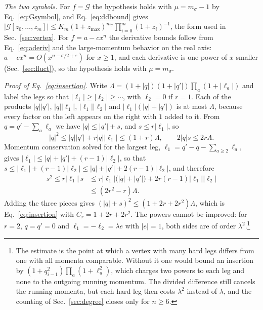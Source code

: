 \documentclass[a4paper,11pt]{article}
\begin{document}
\textit{The two symbols.} For $f=\mathcal G$ the hypothesis holds with $\mu=m_\sigma-1$ by Eq.~\eqref{eq:Gsymbol}, and Eq.~\eqref{eq:ddbound} gives $|\mathcal G[z_0,\dots,z_m]|\le K_m(1+z_{\max})^{m_\sigma}\prod_{i=0}^m(1+z_i)^{-1}$, the form used in Sec.~\ref{sec:vertex}. For $f=a-cx^n$ the derivative bounds follow from Eq.~\eqref{eq:aderiv} and the large-momentum behavior on the real axis: $a-cx^n=O(x^{n-\sigma/2+\varepsilon})$ for $x\ge1$, and each derivative is one power of $x$ smaller (Sec.~\ref{sec:fluct}), so the hypothesis holds with $\mu=m_\sigma$.

\textit{Proof of Eq.~\eqref{eq:insertion}.} Write $\Lambda=(1+|q|)(1+|q'|)\prod_a(1+|\ell_a|)$ and label the legs so that $|\ell_1|\ge|\ell_2|\ge\cdots$, with $\ell_2=0$ if $r=1$. Each of the products $|q||q'|$, $|q||\ell_1|$, $|\ell_1||\ell_2|$ and $|\ell_1|(|q|+|q'|)$ is at most $\Lambda$, because every factor on the left appears on the right with $1$ added to it. From $q=q'-\sum_a\ell_a$ we have $|q|\le|q'|+s$, and $s\le r|\ell_1|$, so
\[
|q|^2\le|q||q'|+r|q||\ell_1|\le(1+r)\Lambda,\qquad 2|q|s\le2r\Lambda .
\]
Momentum conservation solved for the largest leg, $\ell_1=q'-q-\sum_{a\ge2}\ell_a$, gives $|\ell_1|\le|q|+|q'|+(r-1)|\ell_2|$, so that $s\le|\ell_1|+(r-1)|\ell_2|\le|q|+|q'|+2(r-1)|\ell_2|$, and therefore
\[
\begin{aligned}
s^2\le r|\ell_1|\,s&\le r|\ell_1|\bigl(|q|+|q'|\bigr)+2r(r-1)|\ell_1||\ell_2|\\
&\le(2r^2-r)\Lambda .
\end{aligned}
\]
Adding the three pieces gives $(|q|+s)^2\le(1+2r+2r^2)\Lambda$, which is Eq.~\eqref{eq:insertion} with $C_r=1+2r+2r^2$. The powers cannot be improved: for $r=2$, $q=q'=0$ and $\ell_1=-\ell_2=\lambda e$ with $|e|=1$, both sides are of order $\lambda^2$.\footnote{The estimate is the point at which a vertex with many hard legs differs from one with all momenta comparable. Without it one would bound an insertion by $(1+q_{i-1}^2)\prod_a(1+\ell_a^2)$, which charges two powers to each leg and none to the outgoing running momentum. The divided difference still cancels the running momenta, but each hard leg then costs $\lambda^2$ instead of $\lambda$, and the counting of Sec.~\ref{sec:degree} closes only for $n\ge6$.}
\end{document}
